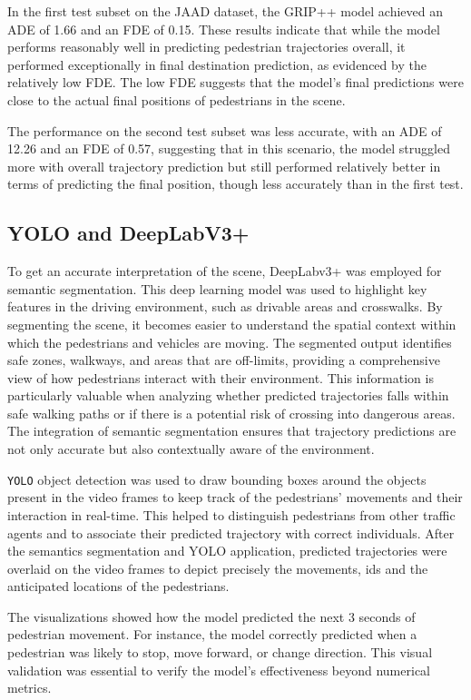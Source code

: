 \tab In the first test subset on the JAAD dataset, the GRIP++ model achieved an ADE of 1.66 and an FDE of 0.15. These results indicate that while the model performs reasonably well in predicting pedestrian trajectories overall, it performed exceptionally in final destination prediction, as evidenced by the relatively low FDE. The low FDE suggests that the model's final predictions were close to the actual final positions of pedestrians in the scene. 

The performance on the second test subset was less accurate, with an ADE of 12.26 and an FDE of 0.57, suggesting that in this scenario, the model struggled more with overall trajectory prediction but still performed relatively better in terms of predicting the final position, though less accurately than in the first test.

\subsection{YOLO and DeepLabV3+}

\tab To get an accurate interpretation of the scene, DeepLabv3+ was employed for semantic segmentation. This deep learning model was used to highlight key features in the driving environment, such as drivable areas and crosswalks. By segmenting the scene, it becomes easier to understand the spatial context within which the pedestrians and vehicles are moving. The segmented output identifies safe zones, walkways, and areas that are off-limits, providing a comprehensive view of how pedestrians interact with their environment. This information is particularly valuable when analyzing whether predicted trajectories falls within safe walking paths or if there is a potential risk of crossing into dangerous areas. The integration of semantic segmentation ensures that trajectory predictions are not only accurate but also contextually aware of the environment.

\tab \verb|YOLO| object detection was used to draw bounding boxes around the objects present in the video frames to keep track of the pedestrians' movements and their interaction in real-time. This helped to distinguish pedestrians from other traffic agents and to associate their predicted trajectory with correct individuals. After the semantics segmentation and YOLO application, predicted trajectories were overlaid on the video frames to depict precisely the movements, ids and the anticipated locations of the pedestrians.  

\tab The visualizations showed how the model predicted the next 3 seconds of pedestrian movement. For instance, the model correctly predicted when a pedestrian was likely to stop, move forward, or change direction. This visual validation was essential to verify the model's effectiveness beyond numerical metrics.




